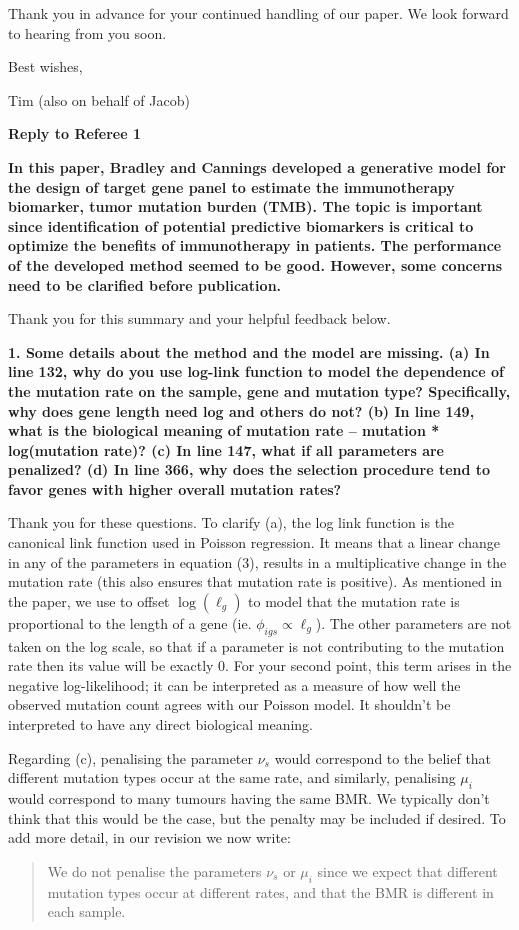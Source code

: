 \documentclass[12pt]{article}
\begin{document}
Thank you in advance for your continued handling of our paper.  We look forward to hearing from you soon. 

Best wishes,

Tim (also on behalf of Jacob)

\bigskip 


\clearpage


{\large \textbf{Reply to Referee 1}}

\textbf{In this paper, Bradley and Cannings developed a generative model for the design of target gene panel to estimate the immunotherapy biomarker, tumor mutation burden (TMB). The topic is important since identification of potential predictive biomarkers is critical to optimize the benefits of immunotherapy in patients. The performance of the developed method seemed to be good. However, some concerns need to be clarified before publication.} 

Thank you for this summary and your helpful feedback below.

\textbf{1. Some details about the method and the model are missing. 
(a) In line 132, why do you use log-link function to model the dependence of the mutation rate on the sample, gene and mutation type? Specifically, why does gene length need log and others do not?
(b) In line 149, what is the biological meaning of mutation rate – mutation * log(mutation rate)?
(c) In line 147, what if all parameters are penalized?
(d) In line 366, why does the selection procedure tend to favor genes with higher overall mutation rates?}

Thank you for these questions.  To clarify (a), the log link function is the canonical link function used in Poisson regression. It means that a linear change in any of the parameters in equation (3), results in a multiplicative change in the mutation rate (this also ensures that mutation rate is positive).  As mentioned in the paper,  we use to offset $\log(\ell_g)$ to model that the mutation rate is proportional to the length of a gene (ie. $\phi_{igs} \propto \ell_g$). The other parameters are not taken on the log scale, so that if a parameter is not contributing to the mutation rate then its value will be exactly 0.  
For your second point, this term arises in the negative log-likelihood; it can be interpreted as a measure of how well the observed mutation count agrees with our Poisson model. It shouldn't be interpreted to have any direct biological meaning. 

Regarding (c), penalising the parameter $\nu_s$ would correspond to the belief that different mutation types occur at the same rate, and similarly, penalising $\mu_i$ would correspond to many tumours having the same BMR. We typically don't think that this would be the case, but the penalty may be included if desired. To add more detail, in our revision we now write:
\begin{quotation}
    We do not penalise the parameters $\nu_s$ or $\mu_i$ since we expect that different mutation types occur at different rates, and that the BMR is different in each sample.
\end{quotation}
\end{document}
